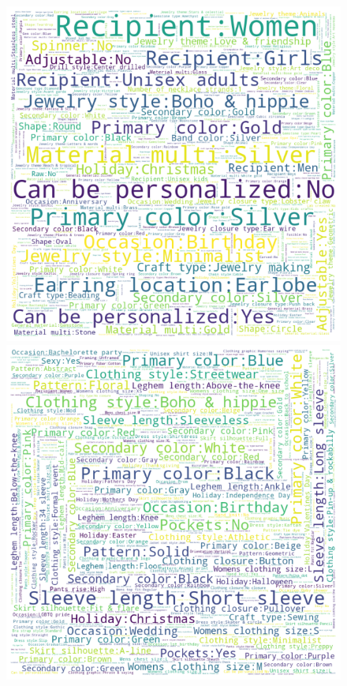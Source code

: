 \documentclass[11pt, dvipdfmx]{article}
\begin{document}
\begin{figure}
    \centering
    \includegraphics[bb=-220 0 -110 100]{figs/jewelry.png}
    \includegraphics[bb=-110 0 0 100]{figs/clothing.png}

\end{figure}
\end{document}
